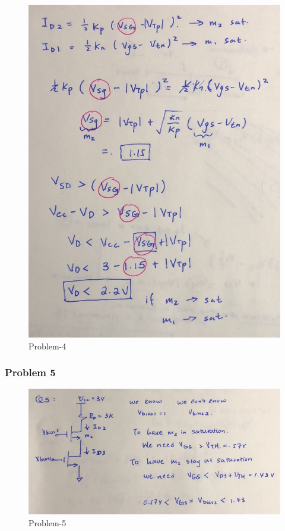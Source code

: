 \documentclass[11pt]{article}
\begin{document}
\begin{figure}
\centering
\includegraphics{./image/Q4-part2-sol.jpg}
\caption{Problem-4}
\end{figure}

    \hypertarget{problem-5}{%
\subsubsection{Problem 5}\label{problem-5}}

\begin{figure}
\centering
\includegraphics{./image/Q5-sol.jpg}
\caption{Problem-5}
\end{figure}


    
    
    
\end{document}
